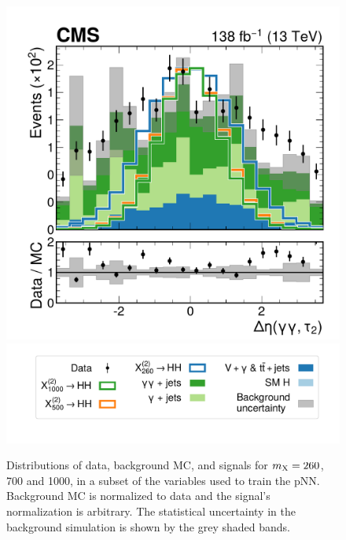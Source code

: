 \begin{figure}
    \includegraphics[width=.49\linewidth]{Figures/Dihiggs/categorisation/input_features/Graviton/Scale_equal/Diphoton_sublead_lepton_deta_GluGluToBulkGravitonToHHTo2G2Tau_M-1000_linear.pdf}
    \includegraphics[width=.7\linewidth]{Figures/Dihiggs/categorisation/input_features/Graviton/Scale_equal/legend.pdf}
    \caption[Distributions of Training Features (2)]{Distributions of data, background MC, and \XTwoHH signals for $m_{\mathrm{X}}=260$, 700 and 1000\GeV, in a subset of the variables used to train the pNN. Background MC is normalized to data and the signal's normalization is arbitrary. The statistical uncertainty in the background simulation is shown by the grey shaded bands.}\label{fig:training_features_2}
\end{figure}

